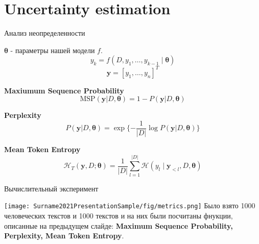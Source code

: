 \documentclass{beamer}
\begin{document}


\section{Uncertainty estimation}
\begin{frame}{Анализ неопределенности}



$\pmb{\theta}$ - параметры нашей модели $f$. 
$$y_k = f(D, y_1, \dots, y_{k - 1} \mid \pmb{\theta})$$
$$\pmb{y} = [y_1, \dots, y_n]^T$$

\textbf{Maxiumum Sequence Probability}
\begin{equation}  
\text{MSP}(\pmb{y} | D, \pmb{\theta}) = 1 -P(\pmb{y} | D, \pmb{\theta})
\end{equation} 


\textbf{Perplexity}
\begin{equation}
P(\textbf{y} | D,  \pmb{\theta}) = \exp\{-\frac{1}{|D|}\log P(\textbf{y} | D, \pmb{\theta})\}
\end{equation} 

\textbf{Mean Token Entropy}
\begin{equation}
\mathcal{H}_T(\mathbf{y}, D ; \boldsymbol{\theta})=\frac{1}{|D|} \sum_{l=1}^{|D|} \mathcal{H}\left(y_l \mid \mathbf{y}_{<l}, D, \boldsymbol{\theta}\right)
\end{equation} 

\end{frame}


\begin{frame}{Вычислительный эксперимент}

\texttt{[image: Surname2021PresentationSample/fig/metrics.png]}
Было взято 1000 человеческих текстов и 1000 текстов и на них были посчитаны фнукции, описанные на предыдущем слайде: \textbf{Maximum Sequence Probability, Perplexity, Mean Token Entropy}.
    
\end{frame}
\end{document}
